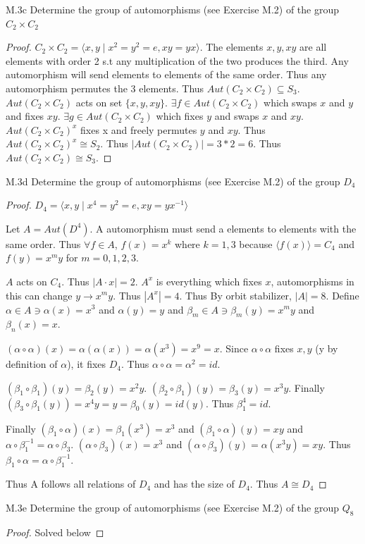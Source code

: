 \documentclass{article}
\begin{document}
\begin{PROB}{M.3c}\label{Problem M.3c.}
    Determine the group of automorphisms (see Exercise M.2) of the group $C_2 \times C_2$
\end{PROB}
\begin{proof}
    $C_2 \times C_2 = \langle x, y \mid x^2 = y^2 = e, xy = yx \rangle$. The elements $x, y, xy$ are all elements with order 2 s.t any multiplication of the two produces the third. Any automorphism will send elements to elements of the same order. Thus any automorphism permutes the 3 elements. Thus $Aut(C_2 \times C_2) \subseteq S_3$. $Aut(C_2 \times C_2)$ acts on set $\{x, y, xy\}$. $\exists f \in Aut(C_2 \times C_2)$ which swaps $x$ and $y$ and fixes $xy$. $\exists g \in Aut(C_2 \times C_2)$ which fixes $y$ and swaps $x$ and $xy$. $Aut(C_2 \times C_2)^x$ fixes x and freely permutes $y$ and $xy$. Thus $Aut(C_2 \times C_2)^x \cong S_2$. Thus $|Aut(C_2 \times C_2)| = 3 * 2 = 6$. Thus $Aut(C_2 \times C_2) \cong S_3$. 
\end{proof}
\begin{PROB}{M.3d}\label{Problem M.3d.}
    Determine the group of automorphisms (see Exercise M.2) of the group $D_4$
\end{PROB}
\begin{proof}
    $D_4 = \langle x, y \mid x^4 = y^2 = e , xy = yx^{-1} \rangle$

    Let $A = Aut(D^4)$.
    A automorphism must send a elements to elements with the same order. Thus $\forall f \in A$, $f(x) = x^k$ where $k = 1, 3$ because $\langle f(x) \rangle = C_4$ and $f(y) = x^my$ for $m = 0, 1, 2,3$.

    $A$ acts on $C_4$. Thus $|A \cdot x| = 2$. $A^x$ is everything which fixes $x$, automorphisms in this can change $y \to x^my$. Thus $|A^x| = 4$. Thus By orbit stabilizer, $|A| = 8$. Define $\alpha \in A \ni \alpha(x) = x^3$ and $\alpha(y) = y$ and $\beta_m \in A \ni \beta_m(y) = x^my$ and $\beta_n(x) = x$.
    
    $(\alpha \circ \alpha)(x) = \alpha(\alpha(x)) = \alpha(x^3) = x^9 = x$. Since $\alpha \circ \alpha$ fixes $x, y$ (y by definition of $\alpha$), it fixes $D_4$. Thus $\alpha \circ \alpha = \alpha^2  = id$. 

    $(\beta_1 \circ \beta_1)(y) = \beta_2(y) = x^2y$. $(\beta_2 \circ \beta_1)(y) = \beta_3(y) = x^3y$. Finally $(\beta_3 \circ \beta_1(y)) = x^4y = y = \beta_0(y) = id(y)$. Thus $\beta_1^4 = id$.
    

    Finally $(\beta_1 \circ \alpha)(x) = \beta_1(x^3) = x^3$ and $(\beta_1 \circ \alpha)(y) = xy$ and $\alpha \circ \beta_1^{-1} = \alpha \circ \beta_3$. $(\alpha \circ \beta_3)(x) = x^3$ and $(\alpha \circ \beta_3)(y) = \alpha(x^3y) = xy$. Thus $\beta_1 \circ \alpha = \alpha \circ \beta_1^{-1}$.

    Thus A follows all relations of $D_4$ and has the size of $D_4$. Thus $A \cong D_4$
\end{proof}
\begin{PROB}{M.3e}\label{Problem M.3e.}
    Determine the group of automorphisms (see Exercise M.2) of the group $Q_8$
\end{PROB}
\begin{proof}
    Solved below
\end{proof}
\end{document}
